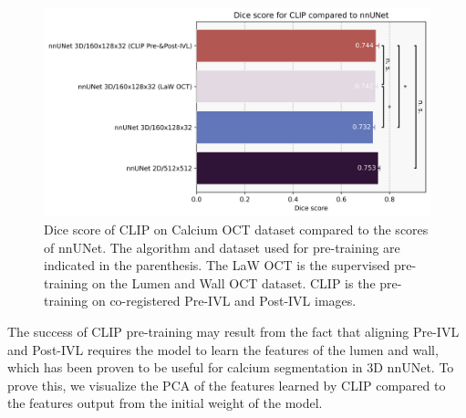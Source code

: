 \documentclass[a4paper,11pt,oneside]{report}
\begin{document}
\begin{figure}[h]
    \centering
    \includegraphics[width=0.65\linewidth]{figures/result_nnUNet_and_CLIP_results.png}
    \caption{Dice score of CLIP on Calcium OCT dataset compared to the scores of nnUNet. The algorithm and dataset used for pre-training are indicated in the parenthesis. The LaW OCT is the supervised pre-training on the Lumen and Wall OCT dataset. CLIP is the pre-training on co-registered Pre-IVL and Post-IVL images.
    }
    \label{fig:clip-results}
\end{figure}

The success of CLIP pre-training may result from the fact that aligning Pre-IVL and Post-IVL requires the model to learn the features of the lumen and wall, which has been proven to be useful for calcium segmentation in 3D nnUNet. To prove this, we visualize the PCA of the features learned by CLIP compared to the features output from the initial weight of the model. 
\end{document}
